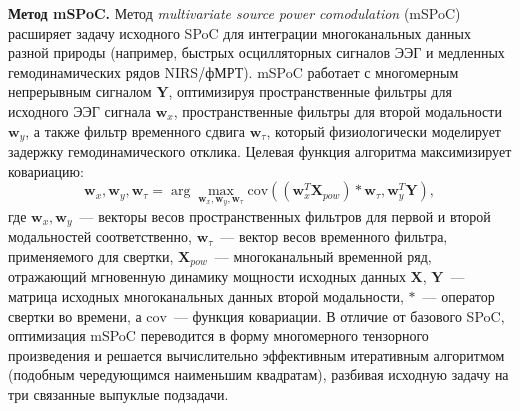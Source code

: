 \textbf{Метод mSPoC.}
Метод \textit{multivariate source power comodulation} (mSPoC)~\cite{dahne2013mspoc} расширяет задачу исходного SPoC для интеграции многоканальных данных разной природы (например, быстрых осцилляторных сигналов ЭЭГ и медленных гемодинамических рядов NIRS/фМРТ). mSPoC работает с многомерным непрерывным сигналом $\mathbf{Y}$, оптимизируя пространственные фильтры для исходного ЭЭГ сигнала $\mathbf{w}_x$, пространственные фильтры для второй модальности $\mathbf{w}_y$, а также фильтр временного сдвига $\mathbf{w}_\tau$, который физиологически моделирует задержку гемодинамического отклика. Целевая функция алгоритма максимизирует ковариацию:
\begin{equation}
	\mathbf{w}_x, \mathbf{w}_y, \mathbf{w}_\tau = \arg\max_{\mathbf{w}_x, \mathbf{w}_y, \mathbf{w}_\tau} \text{cov}\left((\mathbf{w}_x^T \mathbf{X}_{pow}) \ast \mathbf{w}_\tau, \mathbf{w}_y^T \mathbf{Y}\right),
\end{equation}
где $\mathbf{w}_x, \mathbf{w}_y$~--- векторы весов пространственных фильтров для первой и второй модальностей соответственно, $\mathbf{w}_\tau$~--- вектор весов временного фильтра, применяемого для свертки, $\mathbf{X}_{pow}$~--- многоканальный временной ряд, отражающий мгновенную динамику мощности исходных данных $\mathbf{X}$, $\mathbf{Y}$~--- матрица исходных многоканальных данных второй модальности, $\ast$~--- оператор свертки во времени, а $\text{cov}$~--- функция ковариации.
В отличие от базового SPoC, оптимизация mSPoC переводится в форму многомерного тензорного произведения и решается вычислительно эффективным итеративным алгоритмом (подобным чередующимся наименьшим квадратам), разбивая исходную задачу на три связанные выпуклые подзадачи.

